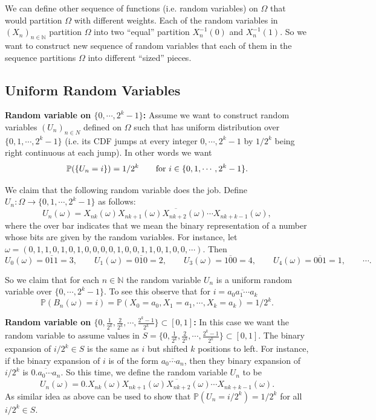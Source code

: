 \documentclass[11pt,a4paper]{article}
\theoremstyle{definition}
\theoremstyle{Example}
\newcommand{\PP}{\mathbb{P}}
\newcommand{\set}[1]{\{#1\}}
\newcommand{\N}{\mathbb{N}}
\begin{document}
	We can define other sequence of functions (i.e. random variables) on $ \Omega $ that would partition $ \Omega $ with different weights. Each of the random variables in $ (X_n)_{n\in\N} $ partition $ \Omega $ into two ``equal'' partition $ X_n^{-1}(0) $ and $ X_n^{-1}(1) $. So we want to construct new sequence of random variables that each of them in the sequence partitions $ \Omega $ into different ``sized'' pieces.
	
	
	\subsection{Uniform Random Variables}
	
	
	\textbf{Random variable on $ \set{0,\cdots,2^{k}-1} $:} Assume we want to construct random variables $ (U_n)_{n\in N} $ defined on $ \Omega $ such that has uniform distribution over $ \set{0,1,\cdots,2^k-1} $ (i.e. its CDF jumps at every integer $ 0,\cdots,2^k-1 $ by $ 1/2^k $ being right continuous at each jump). In other words we want
	\[ \PP(\set{U_n = i}) = 1/2^k \qquad \text{for $ i\in\set{0,1,\cdots,2^k-1} $}. \]
	
	We claim that the following random variable does the job. Define $ U_n:\Omega\to\set{0,1,\cdots,2^k-1} $ as follows:
	\[U_n(\omega) = \overline{X_{nk}(\omega) X_{nk+1}(\omega) X_{nk+2}(\omega)\cdots X_{nk+k-1}(\omega)}, \]
	where the over bar indicates that we mean the binary representation of a number whose bits are given by the random variables. For instance, let $ \omega = (0,1,1,0,1,0,1,0,0,0,0,1,0,0,1,1,0,1,0,0,\cdots) $. Then 
	\[ U_0(\omega) = \overline{011}=3, \qquad U_1(\omega) =\overline{010}=2, \qquad U_3(\omega) = \overline{100}=4, \qquad U_4(\omega) = \overline{001} = 1, \qquad \cdots. \]
	
	So we claim that for each $ n\in\N $ the random variable $ U_n $ is a uniform random variable over $ \set{0,\cdots,2^k-1} $. To see this observe that for $ i = \overline{a_0a_1\cdots a_k} $
	\[ \PP(B_n(\omega) = i) = \PP(X_0=a_0,X_1=a_1,\cdots,X_k=a_k) = 1/2^k. \]
	
	
	\textbf{Random variable on $ \set{0,\frac{1}{2^k},\frac{2}{2^k},\cdots,\frac{2^k-1}{2^k}}\subset[0,1] $:} In this case we want the random variable to assume values in $ S =  \set{0,\frac{1}{2^k},\frac{2}{2^k},\cdots,\frac{2^k-1}{2^k}}\subset[0,1]$. The binary expansion of $ i/2^k \in S $ is the same as $ i $ but shifted $ k $ positions to left. For instance, if the binary expansion of $ i $ is of the form $\overline{ a_0\cdots a_n} $, then they binary expansion of $ i/2^k $ is $ \overline{0.a_0\cdots a_n} $. So this time, we define the random variable $ U_n $ to be
	\[U_n(\omega) = \overline{0.X_{nk}(\omega) X_{nk+1}(\omega) X_{nk+2}(\omega)\cdots X_{nk+k-1}(\omega)}. \]
	As similar idea as above can be used to show that $ \PP(U_n = i/2^k) = 1/2^k  $ for all $ i/2^k \in S $.
	
\end{document}
